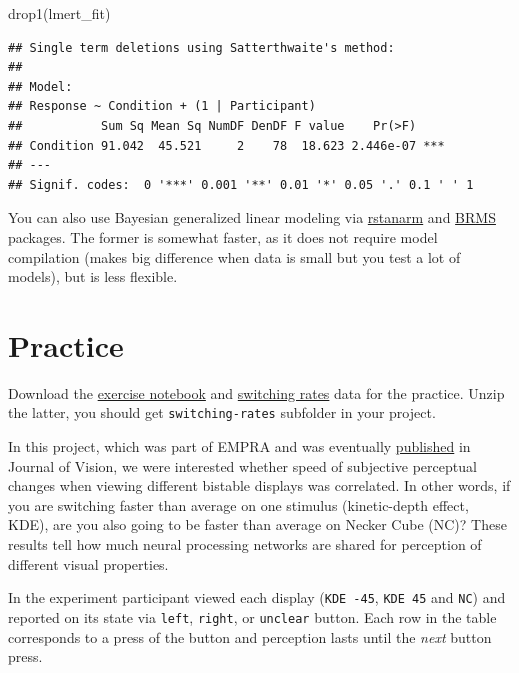 \documentclass[
]{book}
\newenvironment{Shaded}{\begin{snugshade}}{\end{snugshade}}
\newcommand{\FunctionTok}[1]{\textcolor[rgb]{0.00,0.00,0.00}{#1}}
\newcommand{\NormalTok}[1]{#1}
\begin{document}
\begin{Shaded}
\begin{Highlighting}[]
\FunctionTok{drop1}\NormalTok{(lmert\_fit)}
\end{Highlighting}
\end{Shaded}

\begin{verbatim}
## Single term deletions using Satterthwaite's method:
## 
## Model:
## Response ~ Condition + (1 | Participant)
##           Sum Sq Mean Sq NumDF DenDF F value    Pr(>F)    
## Condition 91.042  45.521     2    78  18.623 2.446e-07 ***
## ---
## Signif. codes:  0 '***' 0.001 '**' 0.01 '*' 0.05 '.' 0.1 ' ' 1
\end{verbatim}

You can also use Bayesian generalized linear modeling via \href{https://mc-stan.org/rstanarm/}{rstanarm} and \href{https://github.com/paul-buerkner/brms}{BRMS} packages. The former is somewhat faster, as it does not require model compilation (makes big difference when data is small but you test a lot of models), but is less flexible.

\hypertarget{practice}{%
\section{Practice}\label{practice}}

Download the \href{notebooks/Seminar\%2011\%20-\%20statistics.Rmd}{exercise notebook} and \href{data/switching-rates.zip}{switching rates} data for the practice. Unzip the latter, you should get \texttt{switching-rates} subfolder in your project.

In this project, which was part of EMPRA and was eventually \href{http://jov.arvojournals.org/article.aspx?doi=10.1167/19.6.1}{published} in Journal of Vision, we were interested whether speed of subjective perceptual changes when viewing different bistable displays was correlated. In other words, if you are switching faster than average on one stimulus (kinetic-depth effect, KDE), are you also going to be faster than average on Necker Cube (NC)? These results tell how much neural processing networks are shared for perception of different visual properties.

In the experiment participant viewed each display (\texttt{KDE\ -45}, \texttt{KDE\ 45} and \texttt{NC}) and reported on its state via \texttt{left}, \texttt{right}, or \texttt{unclear} button. Each row in the table corresponds to a press of the button and perception lasts until the \emph{next} button press.
\end{document}
